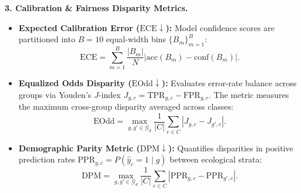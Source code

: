 \documentclass[10pt,twocolumn,letterpaper]{article}
\begin{document}
\smallskip
\noindent\textbf{3. Calibration \& Fairness Disparity Metrics.}
\begin{itemize}[leftmargin=*]
    \item \textbf{Expected Calibration Error ($\mathrm{ECE} \downarrow$):} Model confidence scores are partitioned into $B=10$ equal-width bins $\{B_m\}_{m=1}^B$:
    \begin{equation}
    \mathrm{ECE} = \sum_{m=1}^B \frac{|B_m|}{N} \left| \mathrm{acc}(B_m) - \mathrm{conf}(B_m) \right|.
    \end{equation}
    \item \textbf{Equalized Odds Disparity ($\mathrm{EOdd} \downarrow$):} Evaluates error-rate balance across groups via Youden's $J$-index $J_{g,c} = \mathrm{TPR}_{g,c} - \mathrm{FPR}_{g,c}$. The metric measures the maximum cross-group disparity averaged across classes:
    \begin{equation}
    \mathrm{EOdd} = \max_{g, g' \in \mathcal{G}_d} \frac{1}{|C|} \sum_{c \in C} \left| J_{g,c} - J_{g',c} \right|.
    \end{equation}
    \item \textbf{Demographic Parity Metric ($\mathrm{DPM} \downarrow$):} Quantifies disparities in positive prediction rates $\mathrm{PPR}_{g,c} = P(\hat{y}_c = 1 \mid g)$ between ecological strata:
    \begin{equation}
    \mathrm{DPM} = \max_{g, g' \in \mathcal{G}_d} \frac{1}{|C|} \sum_{c \in C} \left| \mathrm{PPR}_{g,c} - \mathrm{PPR}_{g',c} \right|.
    \end{equation}
\end{itemize}



\end{document}
